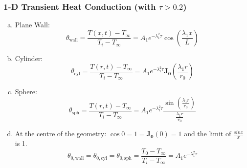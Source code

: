 \documentclass[10pt,compress]{beamer}
\newcommand{\frc}{\displaystyle\frac}
\begin{document}
\begin{frame}
 \frametitle{1-D Transient Heat Conduction (with $\tau > 0.2$)}
   \begin{enumerate}[(a)]%
     \item<1-> Plane Wall:
        \begin{equation}
           \theta_{\text{wall}} = \frc{T(x,t)-T_{\infty}}{T_{i}-T_{\infty}}= A_{1}e^{-\lambda_{1}^{2}\tau}\cos{\left(\frc{\lambda_{1}x}{L}\right)}\label{analytical:wall}
        \end{equation}
     \item<2-> Cylinder:
        \begin{equation}
           \theta_{\text{cyl}} = \frc{T(r,t)-T_{\infty}}{T_{i}-T_{\infty}}= A_{1}e^{-\lambda_{1}^{2}\tau}\mathbf{J_{0}}\left(\frc{\lambda_{1}r}{r_{0}}\right)\label{analytical:cylinder}
        \end{equation}
     \item<3-> Sphere:
        \begin{equation}
           \theta_{\text{sph}} = \frc{T(r,t)-T_{\infty}}{T_{i}-T_{\infty}}= A_{1}e^{-\lambda_{1}^{2}\tau}\frc{\sin{\left(\frc{\lambda_{1}r}{r_{0}}\right)}}{\frc{\lambda_{1}r}{r_{0}}}\label{analytical:sphere}
        \end{equation}

     \item<4-> At the centre of the geometry: $\cos{0}=1=\mathbf{J_{0}}(0)=1$ and the limit of $\frac{sin{x}}{x}$ is 1.
         \begin{equation}
             \theta_{0,\text{wall}} = \theta_{0,\text{cyl}} = \theta_{0,\text{sph}} = \frc{T_{0}-T_{\infty}}{T_{i}-T_{\infty}} = A_{1}e^{-\lambda_{1}^{2}\tau}
         \end{equation}
   \end{enumerate} 

\end{frame}
\end{document}
